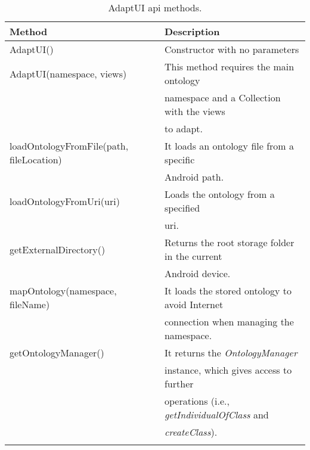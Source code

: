 \begin{center}
\footnotesize
\begin{longtable}{l l}

  \label{tbl:api} \\
  \hline 
  \textbf{Method}				& \textbf{Description}\\
  \hline
  AdaptUI()					& Constructor with no parameters		\\
  AdaptUI(namespace, views)			& This method requires the main ontology 	\\
						& namespace and a Collection with the views	\\
						& to adapt.					\\
  loadOntologyFromFile(path, fileLocation)	& It loads an ontology file from a specific 	\\
						& Android path.					\\
  loadOntologyFromUri(uri)			& Loads the ontology from a specified 		\\
						& \ac{uri}.					\\
  getExternalDirectory()			& Returns the root storage folder in the current\\
						& Android device.				\\
  mapOntology(namespace, fileName)		& It loads the stored ontology to avoid Internet\\
						& connection when managing the namespace.	\\
  getOntologyManager()				& It returns the \textit{OntologyManager} 	\\
						& instance, which gives access to further 	\\
						& operations (i.e., \textit{getIndividualOfClass} and \\
						& \textit{createClass}).			\\
  \hline
    \caption{AdaptUI \ac{api} methods.}\\
\end{longtable}
\end{center}


